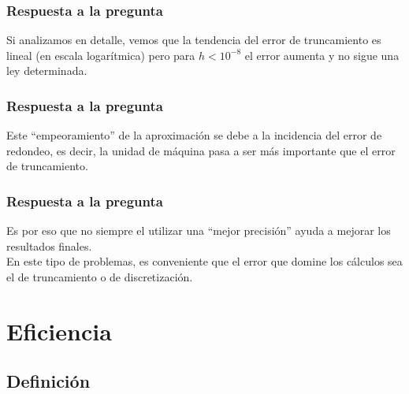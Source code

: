 \documentclass[12pt]{beamer}
\begin{document}
\begin{frame}
\frametitle{Respuesta a la pregunta}
Si analizamos en detalle, vemos que la tendencia del error de truncamiento es lineal (en escala logarítmica) pero para $h < 10^{-8}$ el error aumenta y no sigue una ley determinada. 
\end{frame}
\begin{frame}
\frametitle{Respuesta a la pregunta}
Este \enquote{empeoramiento} de la aproximación se debe a la incidencia del error de redondeo, es decir, la unidad de máquina pasa a ser más importante que el error de truncamiento.
\end{frame}
\begin{frame}
\frametitle{Respuesta a la pregunta}
Es por eso que no siempre el utilizar una \enquote{mejor precisión} ayuda a mejorar los resultados finales. 
\\
\bigskip
En este tipo de problemas, es conveniente que el error que domine los cálculos sea el de truncamiento o de discretización.
\end{frame}

\section{Eficiencia}
\subsection{Definición}
\end{document}
